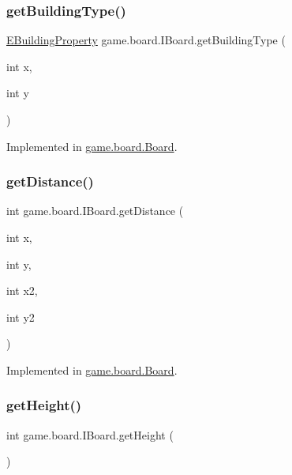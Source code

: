 \subsubsection{\texorpdfstring{get\+Building\+Type()}{getBuildingType()}}
{\footnotesize\ttfamily \mbox{\hyperlink{enumrule_engine_1_1entity_1_1_e_building_property}{E\+Building\+Property}} game.\+board.\+I\+Board.\+get\+Building\+Type (\begin{DoxyParamCaption}\item[{int}]{x,  }\item[{int}]{y }\end{DoxyParamCaption})}



Implemented in \mbox{\hyperlink{classgame_1_1board_1_1_board_ab5376949c9c2ee4fa825e3df27f798ed}{game.\+board.\+Board}}.

\mbox{\label{interfacegame_1_1board_1_1_i_board_ae6a102ff58e3ee5d8cd4c4255790feff}} 
\subsubsection{\texorpdfstring{get\+Distance()}{getDistance()}}
{\footnotesize\ttfamily int game.\+board.\+I\+Board.\+get\+Distance (\begin{DoxyParamCaption}\item[{int}]{x,  }\item[{int}]{y,  }\item[{int}]{x2,  }\item[{int}]{y2 }\end{DoxyParamCaption})}



Implemented in \mbox{\hyperlink{classgame_1_1board_1_1_board_a169a1f68a5c996127f2f762551405026}{game.\+board.\+Board}}.

\mbox{\label{interfacegame_1_1board_1_1_i_board_ac72f72b8a25b8cd594e4c8c1a6ce6ca8}} 
\subsubsection{\texorpdfstring{get\+Height()}{getHeight()}}
{\footnotesize\ttfamily int game.\+board.\+I\+Board.\+get\+Height (\begin{DoxyParamCaption}{ }\end{DoxyParamCaption})}



